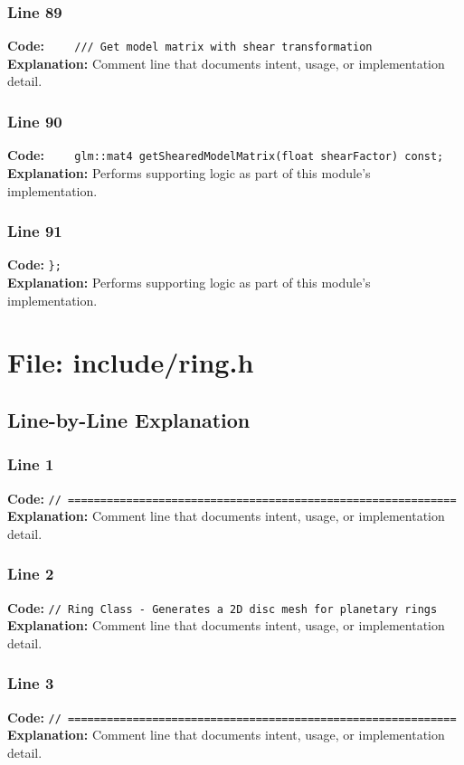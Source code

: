 \documentclass[11pt,a4paper]{article}
\begin{document}
\subsubsection*{Line 89}
\textbf{Code:} \verb|    /// Get model matrix with shear transformation|\\
\textbf{Explanation:} Comment line that documents intent, usage, or implementation detail.

\subsubsection*{Line 90}
\textbf{Code:} \verb|    glm::mat4 getShearedModelMatrix(float shearFactor) const;|\\
\textbf{Explanation:} Performs supporting logic as part of this module's implementation.

\subsubsection*{Line 91}
\textbf{Code:} \verb|};|\\
\textbf{Explanation:} Performs supporting logic as part of this module's implementation.

\newpage
\section{File: include/ring.h}
\subsection{Line-by-Line Explanation}
\subsubsection*{Line 1}
\textbf{Code:} \verb|// ============================================================|\\
\textbf{Explanation:} Comment line that documents intent, usage, or implementation detail.

\subsubsection*{Line 2}
\textbf{Code:} \verb|// Ring Class - Generates a 2D disc mesh for planetary rings|\\
\textbf{Explanation:} Comment line that documents intent, usage, or implementation detail.

\subsubsection*{Line 3}
\textbf{Code:} \verb|// ============================================================|\\
\textbf{Explanation:} Comment line that documents intent, usage, or implementation detail.
\end{document}
